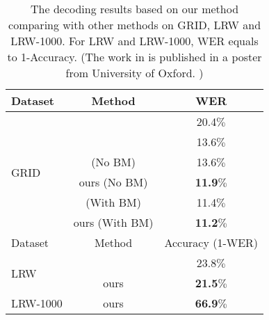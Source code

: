 \documentclass[a4paper, 10pt, conference]{ieeeconf}      %
\begin{document}
	\begin{table}[H]
		\caption{The decoding results based on our method comparing with other methods on GRID, LRW and LRW-1000. For LRW and  LRW-1000, WER equals to 1-Accuracy.  (The work in \cite{Afouras2017} is published in a poster from University of Oxford. ) 
			\vspace{-0.0cm}} \label{table5}
		\setlength{\abovecaptionskip}{0.1cm}   %
		\setlength{\belowcaptionskip}{0cm} 
		\centering
		\begin{tabular}{|p{1.39cm}|c|c|}    
			\hline
			Dataset & Method& WER \\
			\hline
			\hline
			\multirow{6}{*}{GRID}&\cite{Wand2016} & 20.4$\%$      \\
			~&\cite{Gergen2016} & 13.6$\%$     \\
			~&\cite{Assael2016} (No BM) & 13.6$\%$         \\
			~&ours (No BM) & \textbf{11.9}$\%$        \\
			~&\cite{Assael2016} (With BM) & {11.4}$\%$       \\
			~&ours (With BM) & \textbf{11.2}$\%$     \\
			\hline
			\hline
			Dataset & Method& Accuracy (1-WER) \\
			\hline
			\multirow{2}{*}{LRW}&\cite{Afouras2017} &23.8$\%$  \\
			~&ours & \textbf{21.5}$\%$  \\	
			\hline
			\multirow{1}{*}{LRW-1000}&ours &\textbf{66.9}$\%$  \\
			\hline
			
		\end{tabular}
	\end{table}
	
\end{document}
